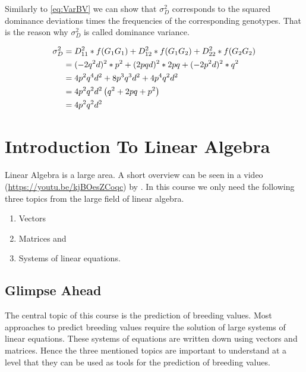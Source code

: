 \documentclass[
]{book}
\providecommand{\tightlist}{%
  \setlength{\itemsep}{0pt}\setlength{\parskip}{0pt}}
\theoremstyle{definition}
\theoremstyle{definition}
\theoremstyle{definition}
\theoremstyle{remark}
\begin{document}
Similarly to \eqref{eq:VarBV} we can show that \(\sigma_D^2\) corresponds to the squared dominance deviations times the frequencies of the corresponding genotypes. That is the reason why \(\sigma_D^2\) is called dominance variance.

\begin{align}
\sigma_D^2  &=  D_{11}^2 * f(G_1G_1) + D_{12}^2 * f(G_1G_2) + D_{22}^2 * f(G_2G_2) \notag \\
            &=   (- 2q^2d)^2 * p^2 + (2pqd)^2 * 2pq + (- 2p^2d)^2 * q^2 \notag \\
            &=  4p^2q^4d^2 + 8p^3q^3d^2 + 4p^4q^2d^2 \notag \\
            &=  4p^2q^2d^2 \left( q^2 + 2pq + p^2 \right) \notag \\
            &=  4p^2q^2d^2 
\label{eq:VarDom}
\end{align}

\cleardoublepage

\hypertarget{appendix-appendix}{%
\appendix}


\hypertarget{intro-linalg}{%
\chapter{Introduction To Linear Algebra}\label{intro-linalg}}

Linear Algebra is a large area. A short overview can be seen in a video (\url{https://youtu.be/kjBOesZCoqc}) by \citep{3Blue1Brown2016}. In this course we only need the following three topics from the large field of linear algebra.

\begin{enumerate}
\def\labelenumi{\arabic{enumi}.}
\tightlist
\item
  Vectors
\item
  Matrices and
\item
  Systems of linear equations.
\end{enumerate}

\hypertarget{intro-linalg-glimpse-ahead}{%
\section{Glimpse Ahead}\label{intro-linalg-glimpse-ahead}}

The central topic of this course is the prediction of breeding values. Most approaches to predict breeding values require the solution of large systems of linear equations. These systems of equations are written down using vectors and matrices. Hence the three mentioned topics are important to understand at a level that they can be used as tools for the prediction of breeding values.
\end{document}
